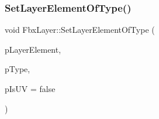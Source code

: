 \subsubsection{\texorpdfstring{Set\+Layer\+Element\+Of\+Type()}{SetLayerElementOfType()}}
{\footnotesize\ttfamily void Fbx\+Layer\+::\+Set\+Layer\+Element\+Of\+Type (\begin{DoxyParamCaption}\item[{\hyperlink{class_fbx_layer_element}{Fbx\+Layer\+Element} $\ast$}]{p\+Layer\+Element,  }\item[{\hyperlink{class_fbx_layer_element_a8c95c5cd880b56c776acd379bd86f42c}{Fbx\+Layer\+Element\+::\+E\+Type}}]{p\+Type,  }\item[{bool}]{p\+Is\+UV = {\ttfamily false} }\end{DoxyParamCaption})}

